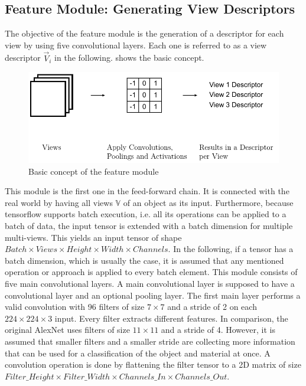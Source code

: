 \subsection{Feature Module: Generating View Descriptors}
\label{sec:architecture-feature-module}
The objective of the feature module is the generation of a descriptor for each view by using five convolutional layers.
Each one is referred to as a view descriptor $\vec{V}_i$ in the following.
 shows the basic concept.
\begin{figure}
	\centering
	\includegraphics[]{images/feature_module.pdf}
	\caption{Basic concept of the feature module}
	\label{fig:feature-module}
\end{figure}
This module is the first one in the feed-forward chain.
It is connected with the real world by having all views $\mathbb{V}$ of an object as its input.
Furthermore, because tensorflow supports batch execution, i.e. all its operations can be applied to a batch of data, the input tensor is extended with a batch dimension for multiple multi-views.
This yields an input tensor of shape $Batch \times Views \times Height \times Width \times Channels$.
In the following, if a tensor has a batch dimension, which is usually the case, it is assumed that any mentioned operation or approach is applied to every batch element.
This module consists of five main convolutional layers.
A main convolutional layer is supposed to have a convolutional layer and an optional pooling layer.
The first main layer performs a valid convolution with 96 filters of size $7 \times 7$ and a stride of 2 on each $224 \times 224 \times 3$ input.
Every filter extracts different features.
In comparison, the original AlexNet uses filters of size $11 \times 11$ and a stride of 4.
However, it is assumed that smaller filters and a smaller stride are collecting more information that can be used for a classification of the object and material at once.
A convolution operation is done by flattening the filter tensor to a 2D matrix of size $Filter\_Height \times Filter\_Width \times Channels\_In \times Channels\_Out$.
